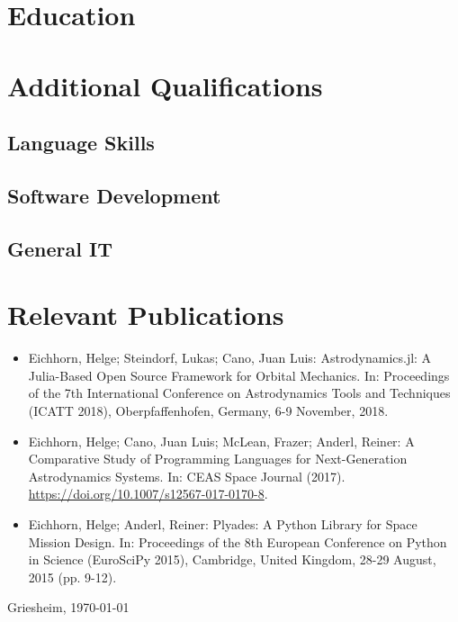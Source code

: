 \documentclass[10pt,a4paper]{moderncv}
\begin{document}
\section{Education}

\section{Additional Qualifications}

\subsection{Language Skills}

\subsection{Software Development}
\subsection{General IT}

\section{Relevant Publications}
\begin{itemize}
    \item Eichhorn, Helge; Steindorf, Lukas; Cano, Juan Luis: Astrodynamics.jl: A Julia-Based Open Source Framework for Orbital Mechanics. In: Proceedings of the 7th International Conference on Astrodynamics Tools and Techniques (ICATT 2018), Oberpfaffenhofen, Germany, 6-9 November, 2018.
    \item Eichhorn, Helge; Cano, Juan Luis; McLean, Frazer; Anderl, Reiner: A Comparative Study of Programming Languages for Next-Generation Astrodynamics Systems. In: CEAS Space Journal (2017). \url{https://doi.org/10.1007/s12567-017-0170-8}.
    \item Eichhorn, Helge; Anderl, Reiner: Plyades: A Python Library for Space Mission Design. In: Proceedings of the 8th European Conference on Python in Science (EuroSciPy 2015), Cambridge, United Kingdom, 28-29 August, 2015 (pp. 9-12).
\end{itemize}
\bigskip
\bigskip
\bigskip
\bigskip
\bigskip

Griesheim, \today
\end{document}
